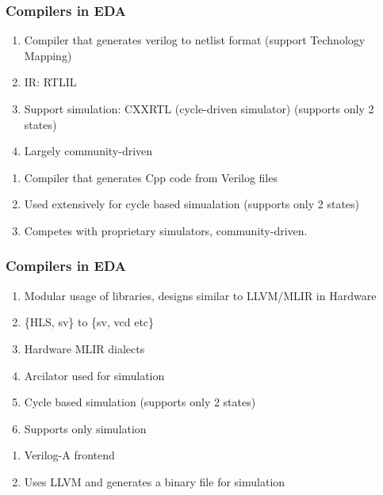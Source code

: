\documentclass{beamer}
\begin{document}
{\begin{frame}[fragile]
    \frametitle{Compilers in EDA}
        \begin{enumerate}
            \item Compiler that generates  verilog to netlist format (support Technology Mapping)
            \item IR: RTLIL
            \item Support simulation: CXXRTL (cycle-driven simulator) (supports
              only 2 states)
            \item Largely community-driven
        \end{enumerate}
        \begin{enumerate}
            \item Compiler that generates Cpp code from Verilog files
            \item Used extensively for cycle based simualation (supports only 2 states)
            \item Competes with proprietary simulators, community-driven.
        \end{enumerate}
    
\end{frame}


\begin{frame}[fragile]
    \frametitle{Compilers in EDA}
        \begin{enumerate}
            \item Modular usage of libraries, designs similar to LLVM/MLIR in Hardware  
            \item \{HLS, sv\} to \{sv, vcd etc\}
            \item Hardware MLIR  dialects 
            \item Arcilator used for simulation 
                \item Cycle based simulation (supports only 2 states)
            \item Supports only simulation 
        \end{enumerate}
        \begin{enumerate}
            \item Verilog-A frontend 
            \item Uses LLVM and generates a binary file for simulation
        \end{enumerate}
\end{frame}

}
\end{document}
